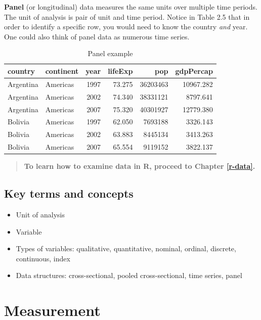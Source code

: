 \documentclass[
]{book}
\providecommand{\tightlist}{%
  \setlength{\itemsep}{0pt}\setlength{\parskip}{0pt}}
\begin{document}
\textbf{Panel} (or longitudinal) data measures the same units over multiple time periods. The unit of analysis is pair of unit and time period. Notice in Table 2.5 that in order to identify a specific row, you would need to know the country \emph{and} year. One could also think of panel data as numerous time series.

\begin{table}

\caption{\label{tab:panel}Panel example}
\centering
\begin{tabular}[t]{l|l|r|r|r|r}
\hline
country & continent & year & lifeExp & pop & gdpPercap\\
\hline
Argentina & Americas & 1997 & 73.275 & 36203463 & 10967.282\\
\hline
Argentina & Americas & 2002 & 74.340 & 38331121 & 8797.641\\
\hline
Argentina & Americas & 2007 & 75.320 & 40301927 & 12779.380\\
\hline
Bolivia & Americas & 1997 & 62.050 & 7693188 & 3326.143\\
\hline
Bolivia & Americas & 2002 & 63.883 & 8445134 & 3413.263\\
\hline
Bolivia & Americas & 2007 & 65.554 & 9119152 & 3822.137\\
\hline
\end{tabular}
\end{table}

\begin{quote}
\textbf{To learn how to examine data in R, proceed to Chapter \ref{r-data}.}
\end{quote}

\hypertarget{kt1}{%
\section{Key terms and concepts}\label{kt1}}

\begin{itemize}
\tightlist
\item
  Unit of analysis
\item
  Variable
\item
  Types of variables: qualitative, quantitative, nominal, ordinal, discrete, continuous, index
\item
  Data structures: cross-sectional, pooled cross-sectional, time series, panel
\end{itemize}

\hypertarget{measurement}{%
\chapter{Measurement}\label{measurement}}
\end{document}
